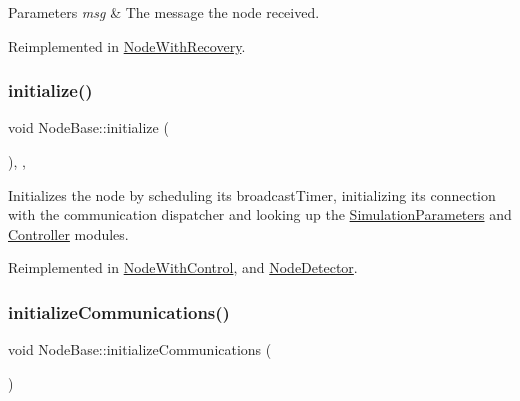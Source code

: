 \begin{DoxyParams}{Parameters}
{\em msg} & The message the node received. \\
\hline
\end{DoxyParams}


Reimplemented in \hyperlink{class_node_with_recovery_a901c89606b84898e13fe8a66228acd9f}{Node\+With\+Recovery}.

\mbox{\label{class_node_base_af7910c39553111295b66c88742d1198a}} 
\subsubsection{\texorpdfstring{initialize()}{initialize()}}
{\footnotesize\ttfamily void Node\+Base\+::initialize (\begin{DoxyParamCaption}{ }\end{DoxyParamCaption})\hspace{0.3cm}{\ttfamily [override]}, {\ttfamily [protected]}, {\ttfamily [virtual]}}



Initializes the node by scheduling it\textquotesingle{}s broadcast\+Timer, initializing its connection with the communication dispatcher and looking up the \hyperlink{class_simulation_parameters}{Simulation\+Parameters} and \hyperlink{class_controller}{Controller} modules. 



Reimplemented in \hyperlink{class_node_with_control_a08c8e80fd67b52c51c642d7c66fe729c}{Node\+With\+Control}, and \hyperlink{class_node_detector_aefa188ab0657837b1b57f24674d3ef22}{Node\+Detector}.

\mbox{\label{class_node_base_a2077b2a599f55050603268dbf8fff6a7}} 
\subsubsection{\texorpdfstring{initialize\+Communications()}{initializeCommunications()}}
{\footnotesize\ttfamily void Node\+Base\+::initialize\+Communications (\begin{DoxyParamCaption}{ }\end{DoxyParamCaption})\hspace{0.3cm}{\ttfamily [protected]}}



